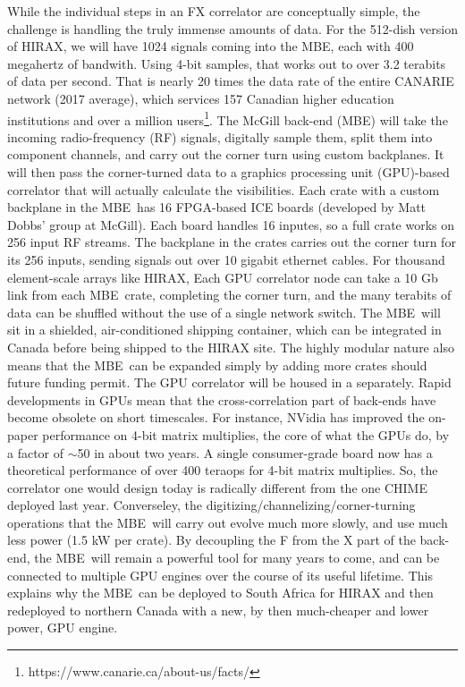 \documentclass[letterpaper,11pt,preprint]{aastex}
\newcommand{\mbe}{{\rm MBE}}
\begin{document}
While the individual steps in an FX correlator are conceptually
simple, the challenge is handling the truly immense amounts of data.
For the 512-dish version of HIRAX, we will have 1024 signals coming
into the \mbe, each with 400 megahertz of bandwith.  Using 4-bit
samples, that works out to over 3.2 terabits of data per second.  That
is nearly 20 times the data rate of the entire CANARIE network (2017
average), which services 157 Canadian higher education institutions
and over a million
users\footnote{https://www.canarie.ca/about-us/facts/}.  The McGill
back-end (\mbe) will take the incoming radio-frequency (RF) signals,
digitally sample them, split them into component channels, and carry
out the corner turn using custom backplanes.  It will then pass the
corner-turned data to a graphics processing unit (GPU)-based
correlator that will actually calculate the visibilities.  Each crate
with a custom backplane in the \mbe\ has 16 FPGA-based ICE boards
(developed by Matt Dobbs' group at McGill).  Each board handles 16
inputes, so a full crate works on 256 input RF streams.  The backplane
in the crates carries out the corner turn for its 256 inputs, sending
signals out over 10 gigabit ethernet cables.  For thousand
element-scale arrays like HIRAX, Each GPU correlator node can take a
10 Gb link from each \mbe\ crate, completing the corner turn, and the
many terabits of data can be shuffled without the use of a single
network switch.  The \mbe\ will sit in a shielded, air-conditioned
shipping container, which can be integrated in Canada before being
shipped to the HIRAX site.  The highly modular nature also means that
the \mbe\ can be expanded simply by adding more crates should future
funding permit.  The GPU correlator will be housed in a separately.
Rapid developments in GPUs mean that the cross-correlation 
part of back-ends have become obsolete on short timescales.
For instance, NVidia has improved the on-paper performance on 4-bit
matrix multiplies, the core of what the GPUs do, by a factor of
$\sim$50 in about two years.  A single consumer-grade board now has a
theoretical performance of over 400 teraops for 4-bit matrix
multiplies.  So, the correlator one would design today is radically
different from the one CHIME deployed last year.  Converseley, the
digitizing/channelizing/corner-turning operations that the \mbe\ will
carry out evolve much more slowly, and use much less power (1.5 kW per
crate).  By decoupling the F from the X part of the back-end, the
\mbe\ will remain a powerful tool for many years to come, and can be
connected to multiple GPU engines over the course of its useful
lifetime.  This explains why the \mbe\ can be deployed to South Africa
for HIRAX and then redeployed to northern Canada with a new, by then
much-cheaper and lower power, GPU engine.
\end{document}
